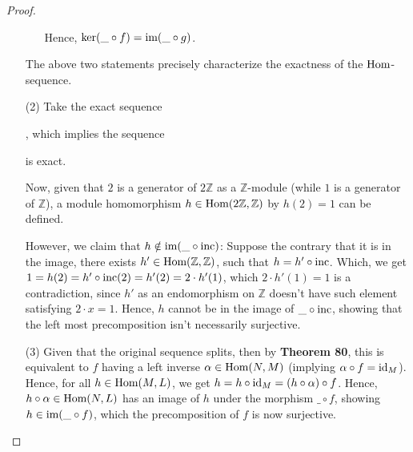 \documentclass[x11names,reqno,12pt]{extarticle}
\newcommand{\id}{\textmd{id}}
\newcommand{\Hom}{\textmd{Hom}}
\begin{document}
\begin{proof}
\begin{itemize}
\begin{itemize}
            Hence, $\ker(\_\circ f)= \textmd{im}(\_\circ g)$.
        \end{itemize}
        The above two statements precisely characterize the exactness of the $\Hom$-sequence.

        \item[(2)] Take the exact sequence , which implies the sequence  is exact.

        Now, given that $2$ is a generator of $2\mathbb{Z}$ as a $\mathbb{Z}$-module (while $1$ is a generator of $\mathbb{Z}$), a module homomorphism $h\in \Hom(2\mathbb{Z},\mathbb{Z})$ by $h(2) = 1$ can be defined.

        However, we claim that $h\notin \textmd{im}(\_\circ \textmd{inc})$: Suppose the contrary that it is in the image, there exists $h'\in\Hom(\mathbb{Z},\mathbb{Z})$, such that $h = h'\circ \textmd{inc}$. Which, we get $1 = h(2) = h'\circ \textmd{inc}(2) = h'(2) = 2\cdot h'(1)$, which $2\cdot h'(1)=1$ is a contradiction, since $h'$ as an endomorphism on $\mathbb{Z}$ doesn't have such element satisfying $2\cdot x = 1$. Hence, $h$ cannot be in the image of $\_\circ \textmd{inc}$, showing that the left most precomposition isn't necessarily surjective.

        \item[(3)] Given that the original sequence splits, then by \textbf{Theorem 80}, this is equivalent to $f$ having a left inverse $\alpha\in \Hom(N, M)$ (implying $\alpha\circ f = \id_M$). Hence, for all $h\in \Hom(M, L)$, we get $h = h \circ \id_M = (h\circ \alpha) \circ f$. Hence, $h\circ \alpha\in \Hom(N,L)$ has an image of $h$ under the morphism $\_\circ f$, showing $h\in \textmd{im}(\_\circ f)$, which the precomposition of $f$ is now surjective.
    \end{itemize}
\end{proof}
\end{document}
